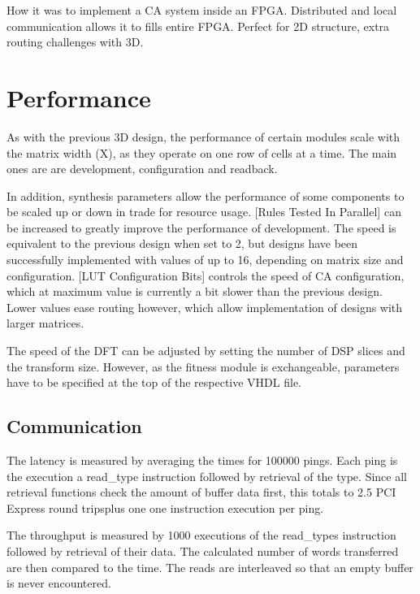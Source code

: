 \TODO
How it was to implement a CA system inside an FPGA.
Distributed and local communication allows it to fills entire FPGA.
Perfect for 2D structure, extra routing challenges with 3D.


\section{Performance}

As with the previous 3D design, the performance of certain modules scale with the matrix width (X), as they operate on one row of cells at a time.
The main ones are are development, configuration and readback.

In addition, synthesis parameters allow the performance of some components to be scaled up or down in trade for resource usage.
[Rules Tested In Parallel] can be increased to greatly improve the performance of development.
The speed is equivalent to the previous design when set to 2, but designs have been successfully implemented with values of up to 16, depending on matrix size and configuration.
[LUT Configuration Bits] controls the speed of CA configuration, which at maximum value is currently a bit slower than the previous design.
Lower values ease routing however, which allow implementation of designs with larger matrices.

The speed of the DFT can be adjusted by setting the number of DSP slices and the transform size.
However, as the fitness module is exchangeable, parameters have to be specified at the top of the respective VHDL file.

\subsection{Communication}


The latency is measured by averaging the times for 100000 pings.
Each ping is the execution a read\_type instruction followed by retrieval of the type.
Since all retrieval functions check the amount of buffer data first, this totals to 2.5 PCI Express round trips\footnotemark plus one one instruction execution per ping.


The throughput is measured by 1000 executions of the read\_types instruction followed by retrieval of their data.
The calculated number of words transferred are then compared to the time.
The reads are interleaved so that an empty buffer is never encountered.

